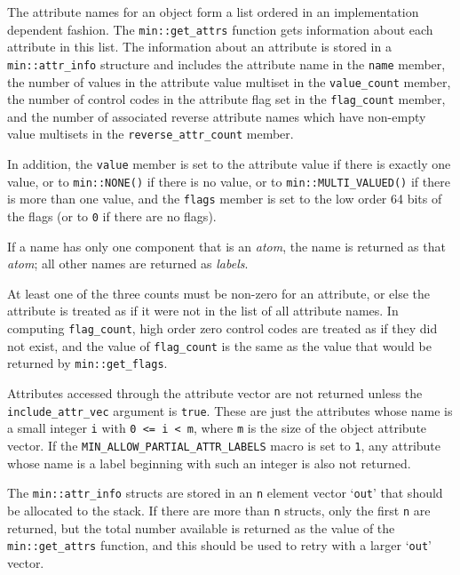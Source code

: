 \documentclass[12pt]{article}
\newcommand{\EOL}{\penalty \exhyphenpenalty}
\begin{document}
The attribute names for an object form a list ordered in an implementation
dependent fashion.  
The {\tt min::\EOL get\_\EOL attrs} function gets information about each
attribute in this list.  The information about an attribute is stored in a
{\tt min::\EOL attr\_\EOL info} structure and includes the attribute
name in the {\tt name} member,
the number of values in the attribute value multiset in the {\tt value\_count}
member, the number of control codes in the attribute flag set in
the {\tt flag\_count} member, and the number of associated
reverse attribute names which have non-empty value multisets in the
{\tt reverse\_attr\_count} member.

In addition, the {\tt value} member is set to the attribute value if there
is exactly one value, or to {\tt min::\EOL NONE()} if there is no value,
or to {\tt min::\EOL MULTI\_\EOL VALUED()} if there is more than one value,
and the {\tt flags} member is set to the low order 64 bits of the flags
(or to {\tt 0} if there are no flags).

If a name has only one component that is an {\em atom}, the name is returned
as that {\em atom}; all other names are returned as {\em labels}.

At least one of the three counts must be
non-zero for an attribute, or else the attribute is treated as if it
were not in the list of all attribute names.  In computing
{\tt flag\_count}, high order zero control codes are treated as if they
did not exist, and the value of {\tt flag\_count} is the
same as the value that would be returned by {\tt min::\EOL get\_\EOL flags}.

Attributes accessed through the attribute vector are not returned unless
the {\tt include\_\EOL attr\_\EOL vec} argument is {\tt true}.  These are
just the attributes whose name is a small integer
{\tt i} with {\tt 0 <= i < m}, where {\tt m} is the size of the object
attribute vector.
If the {\tt MIN\_\EOL ALLOW\_\EOL PARTIAL\_\EOL ATTR\_\EOL LABELS}
macro is set to {\tt 1}, any attribute whose name is a label beginning
with such an integer is also not returned.

The {\tt min::\EOL attr\_\EOL info} structs are stored in an {\tt n}
element vector `{\tt out}'
that should be allocated to the stack.  If there are more than
{\tt n} structs, only the first {\tt n}
are returned, but the total number available is returned as the value of
the {\tt min::\EOL get\_\EOL attrs} function, and this should be used
to retry with a larger `{\tt out}' vector.
\end{document}
